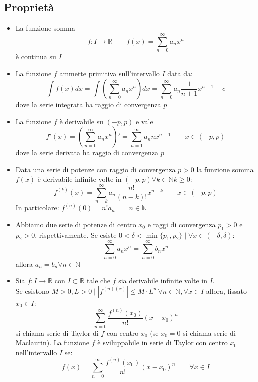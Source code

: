 \documentclass[12pt, a4paper]{article}
\begin{document}
    \subsection{Proprietà}
    \begin{itemize}
        \item La funzione somma \begin{equation*}
            f:I\rightarrow \mathbb{R} \qquad f(x)=\sum_{n=0}^{\infty}a_nx^n
        \end{equation*}
        è continua su $I$
        \item La funzione $f$ ammette primitiva sull'intervallo $I$ data da:
        \begin{equation*}
            \int f(x)dx = \int\left(\sum_{n=0}^{\infty}a_nx^n\right)dx=\sum_{n=0}^{\infty}a_n\frac{1}{n+1}x^{n+1}+c
        \end{equation*}
        dove la serie integrata ha raggio di convergenza $p$
        \item La funzione $f$ è derivabile su $(-p,p)$ e vale \begin{equation*}
            f'(x) = \left(\sum_{n=0}^{\infty}a_nx^n\right)'=\sum_{n=1}^{\infty}a_nnx^{n-1} \qquad x\in (-p,p)
        \end{equation*}
        dove la serie derivata ha raggio di convergenza $p$
        \item Data una serie di potenze con  raggio di convergenza $p>0$ la funzione somma $f(x)$ è derivabile infinite volte in $(-p,p)\forall k\in\mathbb{N}k\geq 0$: \begin{equation*}
            f^{(k)}(x)=\sum_{n=k}^{\infty}a_n\frac{n!}{(n-k)!}x^{n-k} \qquad x\in(-p,p)
        \end{equation*}
        In particolare: $f^{(n)}(0) = n!a_n \qquad n\in\mathbb{N}$
        \item Abbiamo due serie di potenze di centro $x_0$ e raggi di convergenza $p_1>0$ e $p_2>0$, rispettivamente. Se esiste $0<\delta<\min\{p_1,p_2\}\mid\forall x\in(-\delta,\delta)$:
        \begin{equation*}
            \sum_{n=0}^{\infty}a_nx^n = \sum_{n=0}^{\infty}b_nx^n 
        \end{equation*}
        allora $a_n=b_n\forall n\in\mathbb{N}$
        \item Sia $f: I\rightarrow\mathbb{R}$ con $I\subset\mathbb{R}$ tale che $f$ sia derivabile infinite volte in $I$.\\
        Se esistono $M>0,L>0\mid\left|f^{(n)(x)}\right|\leq M\cdot L^n \,\forall n\in\mathbb{N},\forall x\in I$ allora, fissato $x_0\in I$:
        \begin{equation*}
            \sum_{n=0}^{\infty}\frac{f^{(n)}(x_0)}{n!}(x-x_0)^n
        \end{equation*}
        si chiama serie di Taylor di $f$ con centro $x_0$ (se $x_0=0$ si chiama serie di Maclaurin). La funzione $f$ è sviluppabile in serie di Taylor con centro $x_0$ nell'intervallo $I$ se: \begin{equation*}
            f(x) = \sum_{n=0}^{\infty}\frac{f^{(n)}(x_0)}{n!}(x-x_0)^n \qquad \forall x\in I
        \end{equation*}
    \end{itemize}
\end{document}
